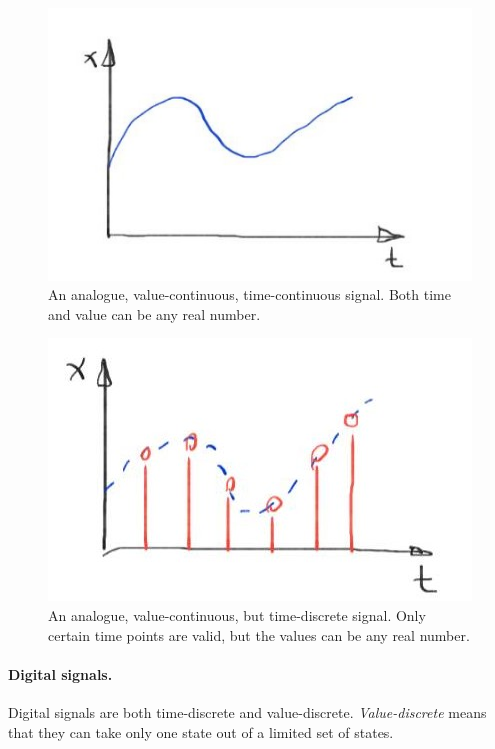 \begin{figure}[H]
	\centering
	\includegraphics{../chapter01/Signal_Analogue.jpg}
	\caption[An analogue, value-continuous, time-continuous signal]{An analogue, value-continuous, time-continuous signal. Both time and value can be any real number.}
	\label{fig:ch01:Signal_Analogue}
\end{figure}

\begin{figure}[H]
	\centering
	\includegraphics{../chapter01/Signal_TimeDiscr.jpg}
	\caption[An analogue, value-continuous, but time-discrete signal]{An analogue, value-continuous, but time-discrete signal. Only certain time points are valid, but the values can be any real number.}
	\label{fig:ch01:Signal_TimeDiscr}
\end{figure}

\paragraph{Digital signals.}

Digital signals are both time-discrete and value-discrete. \emph{Value-discrete} means that they can take only one state out of a limited set of states.

